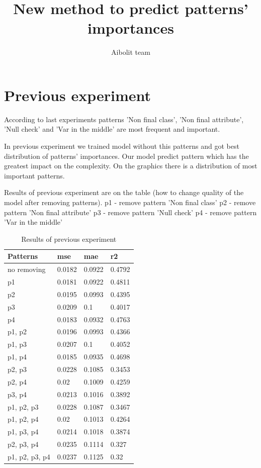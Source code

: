 \documentclass[12pt]{article}
\title{New method to predict patterns' importances}
\author{Aibolit team}
\begin{document}
\maketitle
\newpage

\section*{Previous experiment}
According to last experiments
patterns 'Non final class', 
'Non final attribute', 
'Null check' and 
'Var in the middle' 
are most frequent and important. 

In previous experiment we trained
model without this patterns
and got best distribution of
patterns' importances. 
Our model predict pattern which
has the greatest impact on the
complexity. On the graphics
there is a distribution of 
most important
patterns. 

Results of previous experiment
are on the table (how to change quality
of the model after removing patterns).
\newline
p1 - remove pattern 'Non final class'
\newline
p2 - remove pattern 'Non final attribute'
\newline
p3 - remove pattern 'Null check'
\newline
p4 - remove pattern 'Var in the middle'
\newline

\begin{table}[h] \centering
\begin{tabular}{ | l | l | l | l |} 
	\hline
	Patterns & mse & mae & r2  \\ \hline
	no removing & 0.0182 & 0.0922 &  0.4792 \\ \hline
	p1 & 0.0181 & 0.0922 & 0.4811  \\ \hline
	p2 & 0.0195 & 0.0993 & 0.4395 \\ \hline
	p3 & 0.0209 & 0.1 & 0.4017 \\ \hline
	p4 & 0.0183 & 0.0932 & 0.4763 \\ \hline
	p1, p2 & 0.0196 & 0.0993 & 0.4366 \\ \hline
	p1, p3 & 0.0207 & 0.1 & 0.4052 \\ \hline
	p1, p4 & 0.0185 & 0.0935 & 0.4698 \\ \hline
	p2, p3 & 0.0228 & 0.1085 & 0.3453 \\ \hline
	p2, p4 & 0.02 & 0.1009 &  0.4259 \\ \hline
	p3, p4 & 0.0213 & 0.1016 & 0.3892 \\ \hline
	p1, p2, p3 & 0.0228 & 0.1087 & 0.3467 \\ \hline
	p1, p2, p4 & 0.02 & 0.1013 & 0.4264 \\ \hline
	p1, p3, p4 & 0.0214 & 0.1018 & 0.3874 \\ \hline
	p2, p3, p4 & 0.0235 & 0.1114 & 0.327 \\ \hline
	p1, p2, p3, p4 & 0.0237 & 0.1125 & 0.32 \\ \hline
\end{tabular}
\label{results}
\caption{Results of previous experiment}
\end{table}
\newpage
\end{document}
